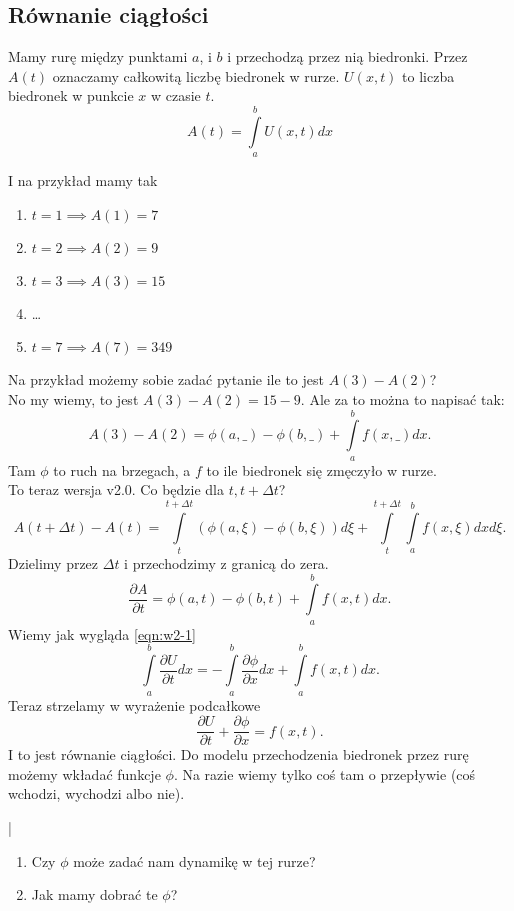 \documentclass[../main.tex]{subfiles}
\begin{document}
    \subsection{Równanie ciągłości}
    Mamy rurę między punktami $a$, i $b$ i przechodzą przez nią biedronki. Przez $A(t)$ oznaczamy całkowitą liczbę biedronek w rurze. $U(x,t)$ to liczba biedronek w punkcie $x$ w czasie $t$.
    \begin{equation}
        \label{eqn:w2-1}
        A(t) = \int\limits_{a}^{b} U(x,t)dx
    \end{equation}

I na przykład mamy tak
\begin{enumerate}
    \item $t = 1 \implies A(1) = 7$
    \item $t = 2 \implies A(2) = 9$
    \item $t = 3 \implies A(3) = 15$
    \item \ldots
    \item $t = 7 \implies A(7) = 349$
\end{enumerate}
Na przykład możemy sobie zadać pytanie ile to jest $A(3) - A(2)$?\\
No my wiemy, to jest $A(3) - A(2) = 15 - 9$. Ale za to można to napisać tak:
\[
    A(3) - A(2) = \phi(a, \_) - \phi(b, \_) + \int\limits_{a}^{b} f(x, \_)dx
.\]
Tam $\phi$ to ruch na brzegach, a $f$ to ile biedronek się zmęczyło w rurze.\\
To teraz wersja v2.0. Co będzie dla  $t, t+\Delta t$?
 \[
     A(t+\Delta t) - A(t) = \int\limits_{t}^{t + \Delta t} \left( \phi\left(a, \xi\right) - \phi\left(b, \xi\right) \right)  d\xi + \int\limits_{t}^{t+\Delta t} \int\limits_{a}^{b} f(x,\xi)dxd\xi
.\]
Dzielimy przez $\Delta t$ i przechodzimy z granicą do zera.
\[
    \frac{\partial A}{\partial t} = \phi(a,t) - \phi(b,t) + \int\limits_{a}^{b} f(x,t)dx
.\]
Wiemy jak wygląda \eqref{eqn:w2-1}
\[
    \int\limits_{a}^{b} \frac{\partial U}{\partial t} dx = -\int\limits_{a}^{b} \frac{\partial \phi}{\partial x} dx + \int\limits_{a}^{b} f(x,t)dx
.\]
Teraz strzelamy w wyrażenie podcałkowe
\[
    \frac{\partial U}{\partial t} + \frac{\partial \phi}{\partial x} = f(x,t)
.\]
I to jest równanie ciągłości. Do modelu przechodzenia biedronek przez rurę możemy wkładać funkcje $\phi$. Na razie wiemy tylko coś tam o przepływie (coś wchodzi, wychodzi albo nie).
\begin{pytanie}|
    \begin{enumerate}
        \item Czy $\phi$ może zadać nam dynamikę w tej rurze?
        \item Jak mamy dobrać te $\phi$?
    \end{enumerate}
\end{pytanie}
\end{document}

